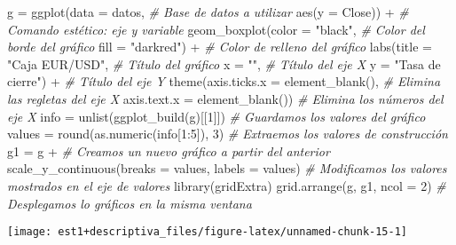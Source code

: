 \documentclass[
]{book}
\newenvironment{Shaded}{\begin{snugshade}}{\end{snugshade}}
\newcommand{\AttributeTok}[1]{\textcolor[rgb]{0.77,0.63,0.00}{#1}}
\newcommand{\CommentTok}[1]{\textcolor[rgb]{0.56,0.35,0.01}{\textit{#1}}}
\newcommand{\DecValTok}[1]{\textcolor[rgb]{0.00,0.00,0.81}{#1}}
\newcommand{\FunctionTok}[1]{\textcolor[rgb]{0.00,0.00,0.00}{#1}}
\newcommand{\NormalTok}[1]{#1}
\newcommand{\OtherTok}[1]{\textcolor[rgb]{0.56,0.35,0.01}{#1}}
\newcommand{\SpecialCharTok}[1]{\textcolor[rgb]{0.00,0.00,0.00}{#1}}
\newcommand{\StringTok}[1]{\textcolor[rgb]{0.31,0.60,0.02}{#1}}
\begin{document}
\begin{Shaded}
\begin{Highlighting}[]
\NormalTok{g }\OtherTok{=} \FunctionTok{ggplot}\NormalTok{(}\AttributeTok{data =}\NormalTok{ datos, }\CommentTok{\# Base de datos a utilizar}
       \FunctionTok{aes}\NormalTok{(}\AttributeTok{y =}\NormalTok{ Close)) }\SpecialCharTok{+} \CommentTok{\# Comando estético: eje y variable}
  \FunctionTok{geom\_boxplot}\NormalTok{(}\AttributeTok{color =} \StringTok{"black"}\NormalTok{, }\CommentTok{\# Color del borde del gráfico}
               \AttributeTok{fill =} \StringTok{"darkred"}\NormalTok{) }\SpecialCharTok{+} \CommentTok{\# Color de relleno del gráfico}
  \FunctionTok{labs}\NormalTok{(}\AttributeTok{title =} \StringTok{"Caja EUR/USD"}\NormalTok{, }\CommentTok{\# Título del gráfico}
       \AttributeTok{x =} \StringTok{""}\NormalTok{, }\CommentTok{\# Título del eje X}
       \AttributeTok{y =} \StringTok{"Tasa de cierre"}\NormalTok{) }\SpecialCharTok{+} \CommentTok{\# Título del eje Y}
  \FunctionTok{theme}\NormalTok{(}\AttributeTok{axis.ticks.x =} \FunctionTok{element\_blank}\NormalTok{(), }\CommentTok{\# Elimina las regletas del eje X}
        \AttributeTok{axis.text.x =} \FunctionTok{element\_blank}\NormalTok{()) }\CommentTok{\# Elimina los números del eje X}
\NormalTok{info }\OtherTok{=} \FunctionTok{unlist}\NormalTok{(}\FunctionTok{ggplot\_build}\NormalTok{(g)[[}\DecValTok{1}\NormalTok{]]) }\CommentTok{\# Guardamos los valores del gráfico}
\NormalTok{values }\OtherTok{=} \FunctionTok{round}\NormalTok{(}\FunctionTok{as.numeric}\NormalTok{(info[}\DecValTok{1}\SpecialCharTok{:}\DecValTok{5}\NormalTok{]), }\DecValTok{3}\NormalTok{) }\CommentTok{\# Extraemos los valores de construcción}
\NormalTok{g1 }\OtherTok{=}\NormalTok{ g }\SpecialCharTok{+} \CommentTok{\# Creamos un nuevo gráfico a partir del anterior}
  \FunctionTok{scale\_y\_continuous}\NormalTok{(}\AttributeTok{breaks =}\NormalTok{ values, }\AttributeTok{labels =}\NormalTok{ values) }\CommentTok{\# Modificamos los valores mostrados en el eje de valores}
\FunctionTok{library}\NormalTok{(gridExtra)}
\FunctionTok{grid.arrange}\NormalTok{(g, g1, }\AttributeTok{ncol =} \DecValTok{2}\NormalTok{) }\CommentTok{\# Desplegamos lo gráficos en la misma ventana}
\end{Highlighting}
\end{Shaded}

\begin{center}\texttt{[image: est1+descriptiva\_files/figure-latex/unnamed-chunk-15-1]} \end{center}
\end{document}
